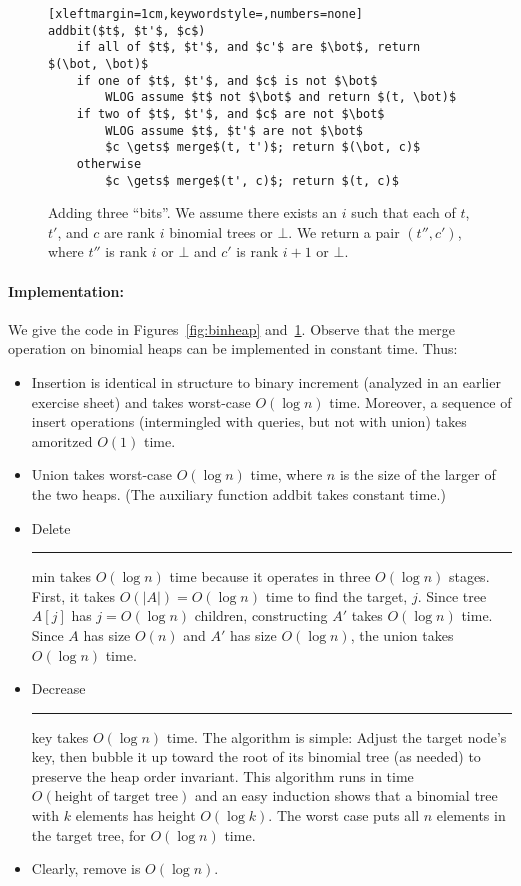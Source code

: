 \documentclass[a4paper]{article}
\newcommand{\any}{{\rule[-.2ex]{1ex}{.4pt}}}	%
\begin{document}
\begin{figure}
\begin{lstlisting}[xleftmargin=1cm,keywordstyle=,numbers=none]
addbit($t$, $t'$, $c$)
	if all of $t$, $t'$, and $c'$ are $\bot$, return $(\bot, \bot)$
	if one of $t$, $t'$, and $c$ is not $\bot$
		WLOG assume $t$ not $\bot$ and return $(t, \bot)$
	if two of $t$, $t'$, and $c$ are not $\bot$
		WLOG assume $t$, $t'$ are not $\bot$
		$c \gets$ merge$(t, t')$; return $(\bot, c)$
	otherwise
		$c \gets$ merge$(t', c)$; return $(t, c)$
\end{lstlisting}
\caption{%
	Adding three ``bits''.
	We assume there exists an $i$ such that each of $t$, $t'$, and $c$ are rank $i$ binomial trees or $\bot$.
	We return a pair $(t'', c')$, where $t''$ is rank $i$ or $\bot$ and $c'$ is rank $i+1$ or $\bot$.
}
\label{fig:binheapbit}
\end{figure}

\paragraph{Implementation:}
We give the code in Figures~\ref{fig:binheap} and~\ref{fig:binheapbit}.
Observe that the merge operation on binomial heaps can be implemented in constant time.
Thus:
\begin{itemize}

\item
Insertion is identical in structure to binary increment (analyzed in an earlier exercise sheet) and takes worst-case $O(\log n)$ time.
Moreover, a sequence of insert operations (intermingled with queries, but not with union) takes amoritzed $O(1)$ time.

\item
Union takes worst-case $O(\log n)$ time, where $n$ is the size of the larger of the two heaps.
(The auxiliary function addbit takes constant time.)

\item
Delete\any{}min takes $O(\log n)$ time because it operates in three $O(\log n)$ stages.
First, it takes $O(|A|) = O(\log n)$ time to find the target, $j$.
Since tree $A[j]$ has $j = O(\log n)$ children, constructing $A'$ takes $O(\log n)$ time.
Since $A$ has size $O(n)$ and $A'$ has size $O(\log n)$, the union takes $O(\log n)$ time.

\item
Decrease\any{}key takes $O(\log n)$ time.
The algorithm is simple:
Adjust the target node's key, then bubble it up toward the root of its binomial tree (as needed) to preserve the heap order invariant.
This algorithm runs in time $O(\text{height of target tree})$ and an easy induction shows that a binomial tree with $k$ elements has height $O(\log k)$.
The worst case puts all $n$ elements in the target tree, for $O(\log n)$ time.

\item
Clearly, remove is $O(\log n)$.

\end{itemize}
\end{document}
